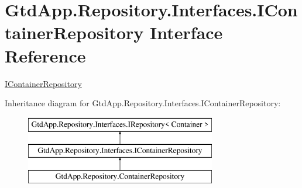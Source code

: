 \hypertarget{interface_gtd_app_1_1_repository_1_1_interfaces_1_1_i_container_repository}{}\section{Gtd\+App.\+Repository.\+Interfaces.\+I\+Container\+Repository Interface Reference}
\label{interface_gtd_app_1_1_repository_1_1_interfaces_1_1_i_container_repository}


\mbox{\hyperlink{interface_gtd_app_1_1_repository_1_1_interfaces_1_1_i_container_repository}{I\+Container\+Repository}}  


Inheritance diagram for Gtd\+App.\+Repository.\+Interfaces.\+I\+Container\+Repository\+:\begin{figure}[H]
\begin{center}
\leavevmode
\includegraphics[height=3.000000cm]{interface_gtd_app_1_1_repository_1_1_interfaces_1_1_i_container_repository}
\end{center}
\end{figure}
